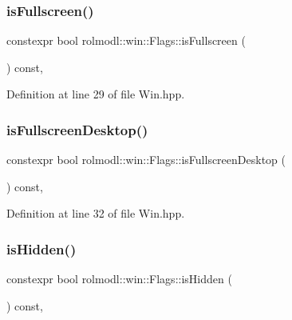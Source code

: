 \subsubsection{\texorpdfstring{isFullscreen()}{isFullscreen()}}
{\footnotesize\ttfamily constexpr bool rolmodl\+::win\+::\+Flags\+::is\+Fullscreen (\begin{DoxyParamCaption}{ }\end{DoxyParamCaption}) const\hspace{0.3cm}{\ttfamily [inline]}, {\ttfamily [noexcept]}}



Definition at line 29 of file Win.\+hpp.

\mbox{\label{structrolmodl_1_1win_1_1_flags_a583810151b94e30166cd476de7c5574a}} 
\subsubsection{\texorpdfstring{isFullscreenDesktop()}{isFullscreenDesktop()}}
{\footnotesize\ttfamily constexpr bool rolmodl\+::win\+::\+Flags\+::is\+Fullscreen\+Desktop (\begin{DoxyParamCaption}{ }\end{DoxyParamCaption}) const\hspace{0.3cm}{\ttfamily [inline]}, {\ttfamily [noexcept]}}



Definition at line 32 of file Win.\+hpp.

\mbox{\label{structrolmodl_1_1win_1_1_flags_a2a8ab288e5dcebcbf4d224236b4820db}} 
\subsubsection{\texorpdfstring{isHidden()}{isHidden()}}
{\footnotesize\ttfamily constexpr bool rolmodl\+::win\+::\+Flags\+::is\+Hidden (\begin{DoxyParamCaption}{ }\end{DoxyParamCaption}) const\hspace{0.3cm}{\ttfamily [inline]}, {\ttfamily [noexcept]}}



